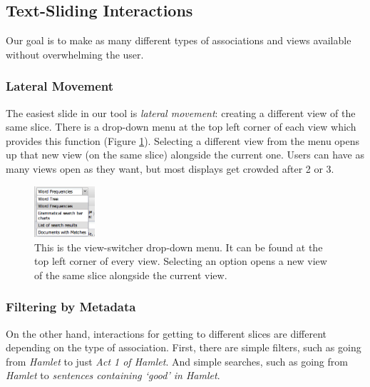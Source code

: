 \documentclass{sig-alternate}
\begin{document}
\subsection{Text-Sliding Interactions}

Our goal is to make as many different types of associations and views available without overwhelming the user.
\subsubsection{Lateral Movement}
The easiest slide in our tool is \emph{lateral movement}: creating a different view of the same slice.  There is a drop-down menu at the top left corner of each view which provides this function (Figure \ref{fig:chris03}).  Selecting a different view from the menu opens up that new view (on the same slice) alongside the current one. Users can have as many views open as they want, but most displays get crowded after 2 or 3.  
\begin{figure}[h!]
\includegraphics[width=0.2\textwidth]{fig/chris/03.png}
\caption{ This is the view-switcher drop-down menu. It can be found at the top left corner of every view. Selecting an option opens a new view  of the same slice alongside the current view. \label{fig:chris03}}
\end{figure}

\subsubsection{Filtering by Metadata}
On the other hand, interactions for getting to different slices are different depending on the type of association. First, there are simple filters, such as going from \emph{Hamlet} to just \emph{Act 1 of Hamlet}. And simple searches, such as going from \emph{Hamlet} to \emph{sentences containing `good' in Hamlet}.
  
\end{document}
